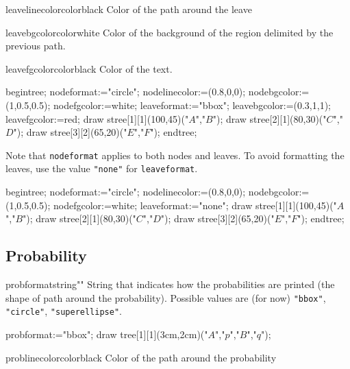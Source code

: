 \documentclass[11pt,a4paper,english]{article}
\begin{document}
\begin{mptparam}{leavelinecolor}{color}{black}
Color of the path around the leave
\end{mptparam}

\begin{mptparam}{leavebgcolor}{color}{white}
Color of the background of the region delimited by the previous path.
\end{mptparam}

\begin{mptparam}{leavefgcolor}{color}{black}
Color of the text.
\end{mptparam}

\begin{exemple}
begintree;
nodeformat:="circle";
nodelinecolor:=(0.8,0,0); nodebgcolor:=(1,0.5,0.5); nodefgcolor:=white;
leaveformat:="bbox";
leavebgcolor:=(0.3,1,1); leavefgcolor:=red;
draw stree[1][1](100,45)("$A$","$B$");
draw stree[2][1](80,30)("$C$","$D$");
draw stree[3][2](65,20)("$E$","$F$");
endtree;
\end{exemple}

Note that \verb|nodeformat| applies to both nodes and leaves. To avoid formatting the leaves, use the value \verb|"none"| for \verb|leaveformat|.

\begin{exemple}
begintree;
nodeformat:="circle";
nodelinecolor:=(0.8,0,0); nodebgcolor:=(1,0.5,0.5); nodefgcolor:=white;
leaveformat:="none";
draw stree[1][1](100,45)("$A$","$B$");
draw stree[2][1](80,30)("$C$","$D$");
draw stree[3][2](65,20)("$E$","$F$");
endtree;
\end{exemple}

\subsection{Probability}

\begin{mptparam}{probformat}{string}{""}
String that indicates how the probabilities are printed (the shape of path around the probability). Possible values are (for now) \verb|"bbox"|, \verb|"circle"|, \verb|"superellipse"|.
\end{mptparam}

\begin{exemple}[lefthand ratio=0.65]
 probformat:="bbox";
 draw tree[1][1](3cm,2cm)("$A$","$p$","$B$","$q$");
\end{exemple}

\begin{mptparam}{problinecolor}{color}{black}
Color of the path around the probability
\end{mptparam}
\end{document}
